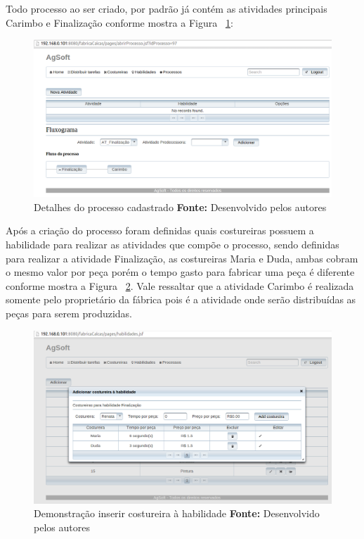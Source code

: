 \par Todo processo ao ser criado, por padrão já contém as atividades principais
 Carimbo e Finalização conforme mostra a Figura ~\ref{fig:processo_cadastrado}:

\begin{figure}[h!]
	\centerline{\includegraphics[scale=0.4]{./imagens/tela_processo_teste1.png}}
	\caption[Detalhes do processo cadastrado]
	{Detalhes do processo cadastrado \textbf{Fonte:} Desenvolvido pelos autores}
	\label{fig:processo_cadastrado}
\end{figure}

\par Após a criação do processo foram definidas quais costureiras possuem a
habilidade para realizar as atividades que compõe o processo, sendo definidas para 
realizar a atividade Finalização, as costureiras Maria e Duda, ambas cobram o 
mesmo valor por peça porém o tempo gasto para fabricar uma peça é diferente 
conforme mostra a Figura ~\ref{fig:costureira_habilidade}. Vale ressaltar que
a atividade Carimbo é realizada somente pelo proprietário da fábrica pois é a
atividade onde serão distribuídas as peças para serem produzidas. 

\newpage

\begin{figure}[h!]
	\centerline{\includegraphics[scale=0.4]{./imagens/tela_habilidade_teste1.png}}
	\caption[Demonstração inserir costureira à habilidade]
	{Demonstração inserir costureira à habilidade \textbf{Fonte:} Desenvolvido pelos autores}
	\label{fig:costureira_habilidade}
\end{figure}


